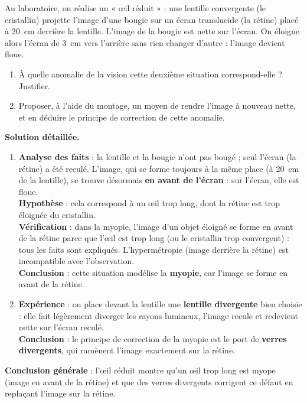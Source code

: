 \documentclass[11pt]{article}
\newcommand{\cle}[1]{{\popxbold\color{popdark}#1}}
\begin{document}
\begin{exoresolu}
Au laboratoire, on réalise un « œil réduit » : une lentille convergente (le cristallin) projette l'image d'une bougie sur un écran translucide (la rétine) placé à \SI{20}{cm} derrière la lentille. L'image de la bougie est nette sur l'écran. On éloigne alors l'écran de \SI{3}{cm} vers l'arrière sans rien changer d'autre : l'image devient floue.
\begin{enumerate}
\item À quelle anomalie de la vision cette deuxième situation correspond-elle ? Justifier.
\item Proposer, à l'aide du montage, un moyen de rendre l'image à nouveau nette, et en déduire le principe de correction de cette anomalie.
\end{enumerate}
\tcblower
\textbf{Solution détaillée.}
\begin{enumerate}
\item \textbf{Analyse des faits} : la lentille et la bougie n'ont pas bougé ; seul l'écran (la rétine) a été reculé. L'image, qui se forme toujours à la même place (à \SI{20}{cm} de la lentille), se trouve désormais \textbf{en avant de l'écran} : sur l'écran, elle est floue.\\
\textbf{Hypothèse} : cela correspond à un œil trop long, dont la rétine est trop éloignée du cristallin.\\
\textbf{Vérification} : dans la \cle{myopie}, l'image d'un objet éloigné se forme en avant de la rétine parce que l'œil est trop long (ou le cristallin trop convergent) : tous les faits sont expliqués. L'hypermétropie (image derrière la rétine) est incompatible avec l'observation.\\
\textbf{Conclusion} : cette situation modélise la \textbf{myopie}, car l'image se forme en avant de la rétine.
\item \textbf{Expérience} : on place devant la lentille une \textbf{lentille divergente} bien choisie : elle fait légèrement diverger les rayons lumineux, l'image recule et redevient nette sur l'écran reculé.\\
\textbf{Conclusion} : le principe de correction de la myopie est le port de \textbf{verres divergents}, qui ramènent l'image exactement sur la rétine.
\end{enumerate}
\textbf{Conclusion générale} : l'œil réduit montre qu'un œil trop long est myope (image en avant de la rétine) et que des verres divergents corrigent ce défaut en replaçant l'image sur la rétine.
\end{exoresolu}
\end{document}
